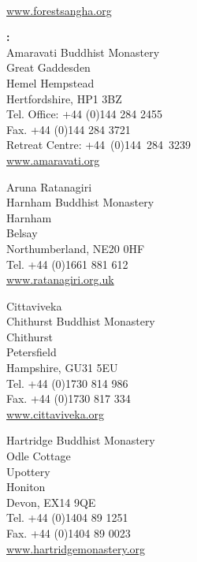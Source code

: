 
\vspace*{-3\onelineskip}

{\centering

{\soChapter{\MakeUppercase{\branchMonasteries}}}

\westernDisciplesOfAjahnChah

\portalPageWorldWide\\
\href{http://www.forestsangha.org}{\textcolor{darkgold}{www.forestsangha.org}}
\vspace*{\baselineskip}

\hspace*{10mm}
\begin{minipage}{0.8\linewidth}
\begin{multicols}{2}
\setlength{\parindent}{0pt}
\setlength{\parskip}{0.8\baselineskip}
\addressesSize

{\raggedright

\textbf{\MakeUppercase{\textUnitedKingdom}:}\\
Amaravati Buddhist Monastery\\
Great Gaddesden\\
Hemel Hempstead\\
Hertfordshire, HP1 3BZ\\
Tel. Office: +44 (0)144 284 2455\\
Fax. +44 (0)144 284 3721\\
Retreat Centre: \mbox{+44 (0)144 284 3239}\\
\href{http://www.amaravati.org}{www.amaravati.org}

Aruna Ratanagiri\\
Harnham Buddhist Monastery\\
Harnham\\
Belsay\\
Northumberland, NE20 0HF\\
Tel. +44 (0)1661 881 612\\
\href{http://www.ratanagiri.org.uk}{www.ratanagiri.org.uk}

Cittaviveka\\
Chithurst Buddhist Monastery\\
Chithurst\\
Petersfield\\
Hampshire, GU31 5EU\\
Tel. +44 (0)1730 814 986\\
Fax. +44 (0)1730 817 334\\
\href{http://www.cittaviveka.org}{www.cittaviveka.org}

Hartridge Buddhist Monastery\\
Odle Cottage\\
Upottery\\
Honiton\\
Devon, EX14 9QE\\
Tel. +44 (0)1404 89 1251\\
Fax. +44 (0)1404 89 0023\\
\href{http://www.hartridgemonastery.org}{www.hartridgemonastery.org}

}
\end{multicols}
\end{minipage}}
